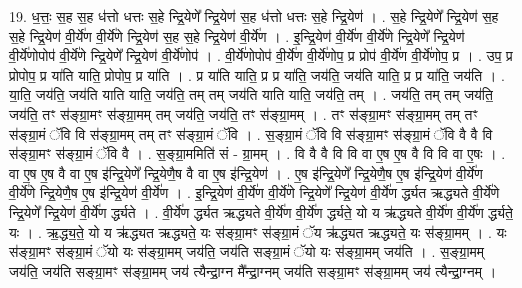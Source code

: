 \documentclass[17pt]{extarticle}
\begin{document}
19. ध॒त्तः॒ स॒ह स॒ह ध॑त्तो धत्तः स॒हे न्द्रि॒येणे᳚ न्द्रि॒येण॑ स॒ह ध॑त्तो धत्तः स॒हे न्द्रि॒येण॑ । . स॒हे न्द्रि॒येणे᳚ न्द्रि॒येण॑ स॒ह स॒हे न्द्रि॒येण॑ वी॒र्ये॑ण वी॒र्ये॑णे न्द्रि॒येण॑ स॒ह स॒हे न्द्रि॒येण॑ वी॒र्ये॑ण । . इ॒न्द्रि॒येण॑ वी॒र्ये॑ण वी॒र्ये॑णे न्द्रि॒येणे᳚ न्द्रि॒येण॑ वी॒र्ये॑णोपोप॑ वी॒र्ये॑णे न्द्रि॒येणे᳚ न्द्रि॒येण॑ वी॒र्ये॑णोप॑ । . वी॒र्ये॑णोपोप॑ वी॒र्ये॑ण वी॒र्ये॑णोप॒ प्र प्रोप॑ वी॒र्ये॑ण वी॒र्ये॑णोप॒ प्र । . उप॒ प्र प्रोपोप॒ प्र या॑ति याति॒ प्रोपोप॒ प्र या॑ति । . प्र या॑ति याति॒ प्र प्र या॑ति॒ जय॑ति॒ जय॑ति याति॒ प्र प्र या॑ति॒ जय॑ति । . या॒ति॒ जय॑ति॒ जय॑ति याति याति॒ जय॑ति॒ तम् तम् जय॑ति याति याति॒ जय॑ति॒ तम् । . जय॑ति॒ तम् तम् जय॑ति॒ जय॑ति॒ तꣳ स॑ङ्ग्रा॒मꣳ स॑ङ्ग्रा॒मम् तम् जय॑ति॒ जय॑ति॒ तꣳ स॑ङ्ग्रा॒मम् । . तꣳ स॑ङ्ग्रा॒मꣳ स॑ङ्ग्रा॒मम् तम् तꣳ स॑ङ्ग्रा॒मं ॅवि वि स॑ङ्ग्रा॒मम् तम् तꣳ स॑ङ्ग्रा॒मं ॅवि । . स॒ङ्ग्रा॒मं ॅवि वि स॑ङ्ग्रा॒मꣳ स॑ङ्ग्रा॒मं ॅवि वै वै वि स॑ङ्ग्रा॒मꣳ स॑ङ्ग्रा॒मं ॅवि वै । . स॒ङ्ग्रा॒ममिति॑ सं - ग्रा॒मम् । . वि वै वै वि वि वा ए॒ष ए॒ष वै वि वि वा ए॒षः । . वा ए॒ष ए॒ष वै वा ए॒ष इ॑न्द्रि॒येणे᳚ न्द्रि॒येणै॒ष वै वा ए॒ष इ॑न्द्रि॒येण॑ । . ए॒ष इ॑न्द्रि॒येणे᳚ न्द्रि॒येणै॒ष ए॒ष इ॑न्द्रि॒येण॑ वी॒र्ये॑ण वी॒र्ये॑णे न्द्रि॒येणै॒ष ए॒ष इ॑न्द्रि॒येण॑ वी॒र्ये॑ण । . इ॒न्द्रि॒येण॑ वी॒र्ये॑ण वी॒र्ये॑णे न्द्रि॒येणे᳚ न्द्रि॒येण॑ वी॒र्ये॑ण र्द्ध्यत ऋद्ध्यते वी॒र्ये॑णे न्द्रि॒येणे᳚ न्द्रि॒येण॑ वी॒र्ये॑ण र्द्ध्यते । . वी॒र्ये॑ण र्द्ध्यत ऋद्ध्यते वी॒र्ये॑ण वी॒र्ये॑ण र्द्ध्यते॒ यो य ऋ॑द्ध्यते वी॒र्ये॑ण वी॒र्ये॑ण र्द्ध्यते॒ यः । . ऋ॒द्ध्य॒ते॒ यो य ऋ॑द्ध्यत ऋद्ध्यते॒ यः स॑ङ्ग्रा॒मꣳ स॑ङ्ग्रा॒मं ॅय ऋ॑द्ध्यत ऋद्ध्यते॒ यः स॑ङ्ग्रा॒मम् । . यः स॑ङ्ग्रा॒मꣳ स॑ङ्ग्रा॒मं ॅयो यः स॑ङ्ग्रा॒मम् जय॑ति॒ जय॑ति सङ्ग्रा॒मं ॅयो यः स॑ङ्ग्रा॒मम् जय॑ति । . स॒ङ्ग्रा॒मम् जय॑ति॒ जय॑ति सङ्ग्रा॒मꣳ स॑ङ्ग्रा॒मम् जय॑ त्यैन्द्रा॒ग्न मै᳚न्द्रा॒ग्नम् जय॑ति सङ्ग्रा॒मꣳ स॑ङ्ग्रा॒मम् जय॑ त्यैन्द्रा॒ग्नम् । \newline
\end{document}
